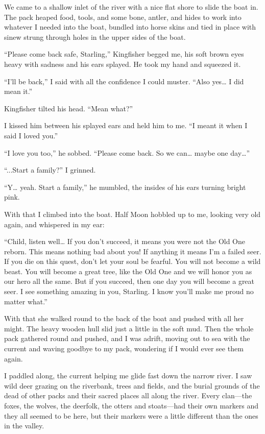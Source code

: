 \vspace{-0.5em}

We came to a shallow inlet of the river with a nice flat shore to slide the boat in. The pack heaped food, tools, and some bone, antler, and hides to work into whatever I needed into the boat, bundled into horse skins and tied in place with sinew strung through holes in the upper sides of the boat.

``Please come back safe, Starling,'' Kingfisher begged me, his soft brown eyes heavy with sadness and his ears splayed. He took my hand and squeezed it.

``I'll be back,'' I said with all the confidence I could muster. ``Also yes\ldots{} I did mean it.''

Kingfisher tilted his head. ``Mean what?''

I kissed him between his splayed ears and held him to me. ``I meant it when I said I loved you.''

``I love you too,'' he sobbed. ``Please come back. So we can\ldots{} maybe one day\ldots''

``...Start a family?'' I grinned.

``Y\ldots{} yeah. Start a family,'' he mumbled, the insides of his ears turning bright pink.

With that I climbed into the boat. Half Moon hobbled up to me, looking very old again, and whispered in my ear:

``Child, listen well\ldots{} If you don't succeed, it means you were not the Old One reborn. This means nothing bad about you! If anything it means I'm a failed seer. If you die on this quest, don't let your soul be fearful. You will not become a wild beast. You will become a great tree, like the Old One and we will honor you as our hero all the same. But if you succeed, then one day you will become a great seer. I see something amazing in you, Starling. I know you'll make me proud no matter what.''

With that she walked round to the back of the boat and pushed with all her might. The heavy wooden hull slid just a little in the soft mud. Then the whole pack gathered round and pushed, and I was adrift, moving out to sea with the current and waving goodbye to my pack, wondering if I would ever see them again.

I paddled along, the current helping me glide fast down the narrow river. I saw wild deer grazing on the riverbank, trees and fields, and the burial grounds of the dead of other packs and their sacred places all along the river. Every clan---the foxes, the wolves, the deerfolk, the otters and stoats---had their own markers and they all seemed to be here, but their markers were a little different than the ones in the valley.

